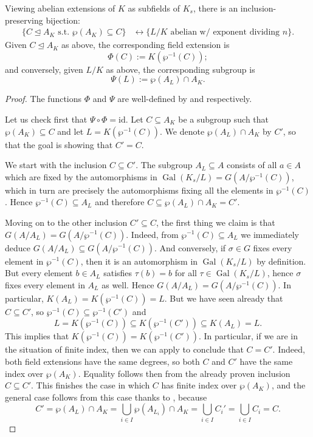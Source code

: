 \documentclass[12pt]{amsart}
\DeclareMathOperator{\Gal}{Gal}
\newcommand{\id}{\mathrm{id}}
\begin{document}
\begin{thm}
    Viewing abelian extensions of $K$ as subfields of $K_{s}$, there is an inclusion-preserving bijection:
    \begin{align*}
	\{ C\trianglelefteq A_{K} \text{ s.t. } \wp(A_{K})\subseteq C \} & \leftrightarrow \{ L/K \text{ abelian w/ exponent dividing } n\}.
    \end{align*}
    Given $C\trianglelefteq A_{K}$ as above, the corresponding field extension is
    \[ \Phi(C):=K(\wp^{-1}(C)); \]
    and conversely, given $L/K$ as above, the corresponding subgroup is
    \[ \Psi(L):=\wp(A_{L})\cap A_{K}. \]
    \begin{proof}
	The functions $\Phi$ and $\Psi$ are well-defined by  and  respectively.

	Let us check first that $\Psi\circ \Phi=\id$.
	Let $C\subseteq A_{K}$ be a subgroup such that $\wp(A_{K})\subseteq C$ and let $L=K(\wp^{-1}(C))$.
	We denote $\wp(A_{L})\cap A_{K}$ by $C'$, so that the goal is showing that $C'=C$.

	We start with the inclusion $C\subseteq C'$.
	The subgroup $A_{L}\subseteq A$ consists of all $a\in A$ which are fixed by the automorphisms in $\Gal(K_{s}/L)=G(A/\wp^{-1}(C))$, which in turn are precisely the automorphisms fixing all the elements in $\wp^{-1}(C)$.
	Hence $\wp^{-1}(C)\subseteq A_{L}$ and therefore $C\subseteq \wp(A_{L})\cap A_{K}=C'$.

	Moving on to the other inclusion $C'\subseteq C$, the first thing we claim is that $G(A/A_{L})=G(A/\wp^{-1}(C))$.
	Indeed, from $\wp^{-1}(C)\subseteq A_{L}$ we immediately deduce $G(A/A_{L})\subseteq G(A/\wp^{-1}(C))$.
	And conversely, if $\sigma\in G$ fixes every element in $\wp^{-1}(C)$, then it is an automorphism in $\Gal(K_{s}/L)$ by definition.
	But every element $b\in A_{L}$ satisfies $\tau(b)=b$ for all $\tau\in \Gal(K_{s}/L)$, hence $\sigma$ fixes every element in $A_{L}$ as well.
	Hence $G(A/A_{L})=G(A/\wp^{-1}(C))$.
	In particular, $K(A_{L})=K(\wp^{-1}(C))=L$.
	But we have seen already that $C\subseteq C'$, so $\wp^{-1}(C)\subseteq \wp^{-1}(C')$ and
	\[ L=K(\wp^{-1}(C))\subseteq K(\wp^{-1}(C'))\subseteq K(A_{L})=L. \]
	This implies that $K(\wp^{-1}(C))=K(\wp^{-1}(C'))$.
	In particular, if we are in the situation of finite index, then we can apply  to conclude that $C=C'$.
	Indeed, both field extensions have the same degrees, so both $C$ and $C'$ have the same index over $\wp(A_{K})$.
	Equality follows then from the already proven inclusion $C\subseteq C'$.
	This finishes the case in which $C$ has finite index over $\wp(A_{K})$, and the general case follows from this case thanks to , because
	\[ C'=\wp(A_{L})\cap A_{K}=\bigcup_{i\in I}\wp(A_{L_{i}})\cap A_{K}=\bigcup_{i\in I}C_{i}'=\bigcup_{i\in I}C_{i}=C. \]


\end{proof}
\end{thm}
\end{document}
